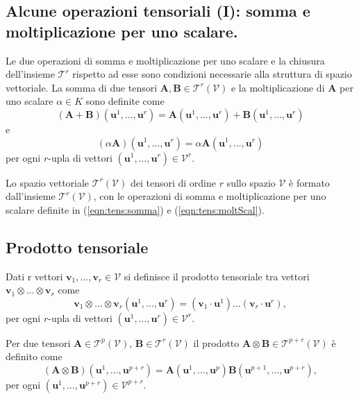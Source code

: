  \subsection{Alcune operazioni tensoriali (I): somma e moltiplicazione per uno scalare.}\label{ch:tensori:operazioniI}
 Le due operazioni di somma e moltiplicazione per uno scalare e la chiusura dell'insieme $\mathcal{T}^r$ rispetto ad esse sono condizioni necessarie alla struttura di spazio vettoriale. La somma di due tensori $\bm{A},\bm{B} \in \mathcal{T}^r(\mathcal{V})$ e la moltiplicazione di $\bm{A}$ per uno scalare $\alpha \in K$ sono definite come
\begin{equation}\label{eqn:tens:somma}
 (\bm{A}+\bm{B})(\bm{u}^1,\dots,\bm{u}^r) = 
   \bm{A} (\bm{u}^1,\dots,\bm{u}^r) +
   \bm{B} (\bm{u}^1,\dots,\bm{u}^r)
\end{equation}
 e
\begin{equation}\label{eqn:tens:moltScal}
 ( \alpha \bm{A} ) (\bm{u}^1,\dots,\bm{u}^r) = 
   \alpha \bm{A}   (\bm{u}^1,\dots,\bm{u}^r)
\end{equation}
 per ogni $r$-upla di vettori $(\bm{u}^1,\dots,\bm{u}^r) \in \mathcal{V}^r$.
%
\vspace{15pt}
\begin{definition} Lo spazio vettoriale $\mathcal{T}^r(\mathcal{V})$ dei tensori di ordine $r$ sullo spazio $\mathcal{V}$ è formato dall'insieme $\mathcal{T}^r(\mathcal{V})$, con le operazioni di somma e moltiplicazione per uno scalare definite in (\ref{eqn:tens:somma}) e (\ref{eqn:tens:moltScal}).
\end{definition}
%
 \subsection{Prodotto tensoriale} Dati r vettori $\bm{v}_1,\dots,\bm{v}_r \in \mathcal{V}$  si definisce il prodotto tensoriale tra vettori
 $\bm{v}_1 \otimes \dots \otimes \bm{v}_r$ come
\begin{equation}
  \bm{v}_1 \otimes \dots \otimes \bm{v}_r 
  (\bm{u}^1,\dots,\bm{u}^r) = 
  (\bm{v}_1 \cdot \bm{u}^1) \dots ( \bm{v}_r \cdot \bm{u}^r ) ,
\end{equation}
 per ogni $r$-upla di vettori $(\bm{u}^1,\dots,\bm{u}^r) \in \mathcal{V}^r$.
 
 \noindent
 Per due tensori $\bm{A} \in \mathcal{T}^p(\mathcal{V})$, $\bm{B} \in \mathcal{T}^r(\mathcal{V})$
 il prodotto $\bm{A} \otimes \bm{B} \in \mathcal{T}^{p+r}(\mathcal{V})$ è definito come
\begin{equation}
 (\bm{A}\otimes\bm{B})(\bm{u}^1,\dots,\bm{u}^{p+r}) = 
   \bm{A} (\bm{u}^1,\dots,\bm{u}^p)
   \bm{B} (\bm{u}^{p+1},\dots,\bm{u}^{p+r}) ,
\end{equation}
 per ogni $(\bm{u}^1,\dots,\bm{u}^{p+r}) \in \mathcal{V}^{p+r}$.

